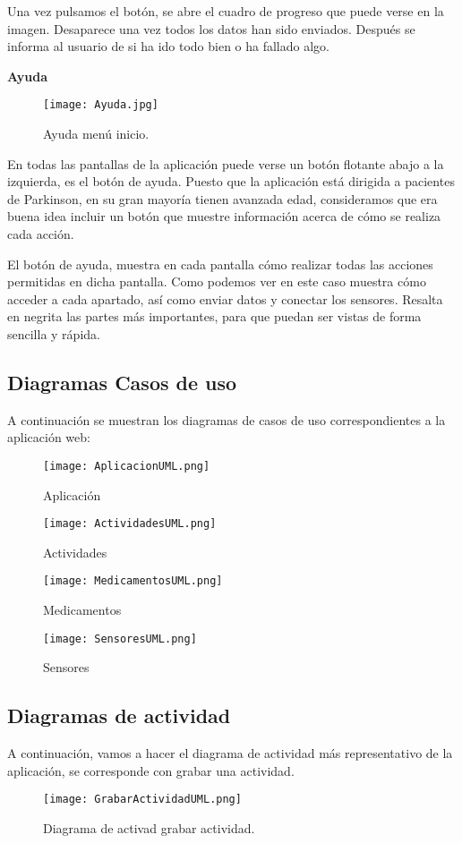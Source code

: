 Una vez pulsamos el botón, se abre el cuadro de progreso que puede verse en la imagen. Desaparece una vez todos los datos han sido enviados. Después se informa al usuario de si ha ido todo bien o ha fallado algo.
\newline
\newpage

{\bf Ayuda}
\begin{figure}[h!]
\centering
\texttt{[image: Ayuda.jpg]}
\caption{Ayuda menú inicio.}
\end{figure}

En todas las pantallas de la aplicación puede verse un botón flotante abajo a la izquierda, es el botón de ayuda. Puesto que la aplicación está dirigida a pacientes de Parkinson, en su gran mayoría tienen avanzada edad, consideramos que era buena idea incluir un botón que muestre información acerca de cómo se realiza cada acción.
\newline

El botón de ayuda, muestra en cada pantalla cómo realizar todas las acciones permitidas en dicha pantalla. Como podemos ver en este caso muestra cómo acceder a cada apartado, así como enviar datos y conectar los sensores. Resalta en negrita las partes más importantes, para que puedan ser vistas de forma sencilla y rápida.
\newpage

\subsection{Diagramas Casos de uso}
A continuación se muestran los diagramas de casos de uso correspondientes a la aplicación web:
\newline
\begin{figure}[!htb]
  \texttt{[image: AplicacionUML.png]}
  \caption{Aplicación}
\endminipage\hfill
{}
  \texttt{[image: ActividadesUML.png]}
  \caption{Actividades}
\endminipage\hfill
\end{figure}

\begin{figure}[!htb]
%
  \texttt{[image: MedicamentosUML.png]}
  \caption{Medicamentos}
\endminipage
{}%
  \texttt{[image: SensoresUML.png]}
  \caption{Sensores}
\endminipage
\end{figure}
\newpage

\subsection{Diagramas de actividad}
A continuación, vamos a hacer el diagrama de actividad más representativo de la aplicación, se corresponde con grabar una actividad.
\begin{figure}[h!]
  \centering
  \texttt{[image: GrabarActividadUML.png]}
  \caption{Diagrama de activad grabar actividad.}
\end{figure}
\newpage

